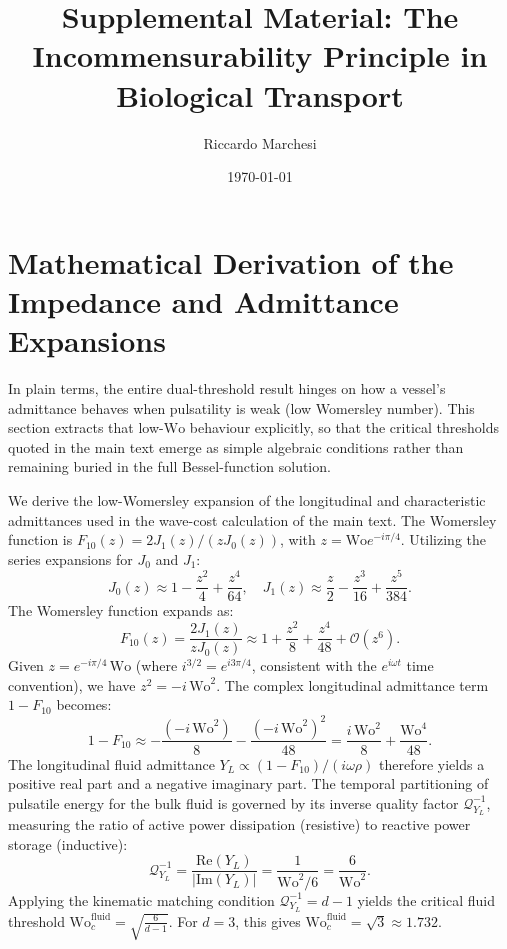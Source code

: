 \documentclass[11pt,a4paper]{article}
\title{Supplemental Material: The Incommensurability Principle in Biological Transport}
\author{Riccardo Marchesi}
\date{\today}
\theoremstyle{remark}
\begin{document}
\maketitle

\section{Mathematical Derivation of the Impedance and Admittance Expansions}
\label{sec:S1}

In plain terms, the entire dual-threshold result hinges on how a vessel's
admittance behaves when pulsatility is weak (low Womersley number). This section
extracts that low-$\mathrm{Wo}$ behaviour explicitly, so that the critical
thresholds quoted in the main text emerge as simple algebraic conditions rather
than remaining buried in the full Bessel-function solution.

We derive the low-Womersley expansion of the longitudinal and characteristic
admittances used in the wave-cost calculation of the main text. The Womersley
function is $F_{10}(z) = 2J_1(z)/(zJ_0(z))$, with $z = \mathrm{Wo} e^{-i\pi/4}$.
Utilizing the series expansions for $J_0$ and $J_1$:
\begin{equation}
    J_0(z) \approx 1 - \frac{z^2}{4} + \frac{z^4}{64}, \quad J_1(z) \approx \frac{z}{2} - \frac{z^3}{16} + \frac{z^5}{384}.
\end{equation}
The Womersley function expands as:
\begin{equation}
    F_{10}(z) = \frac{2J_1(z)}{z J_0(z)} \approx 1 + \frac{z^2}{8} + \frac{z^4}{48} + \mathcal{O}(z^6).
\end{equation}
Given $z = e^{-i\pi/4}\,\mathrm{Wo}$ (where $i^{3/2} = e^{i3\pi/4}$, consistent
with the $e^{i\omega t}$ time convention), we have $z^2 = -i\,\mathrm{Wo}^2$.
The complex longitudinal admittance term $1 - F_{10}$ becomes:
\begin{equation}
    1 - F_{10} \approx -\frac{(-i\,\mathrm{Wo}^2)}{8} - \frac{(-i\,\mathrm{Wo}^2)^2}{48}
    = \frac{i\,\mathrm{Wo}^2}{8} + \frac{\mathrm{Wo}^4}{48}.
\end{equation}
The longitudinal fluid admittance $Y_L \propto (1 - F_{10})/(i\omega\rho)$
therefore yields a positive real part and a negative imaginary part. The
temporal partitioning of pulsatile energy for the bulk fluid is governed by its
inverse quality factor $\mathcal{Q}^{-1}_{Y_L}$, measuring the ratio of active
power dissipation (resistive) to reactive power storage (inductive):
\begin{equation}
    \mathcal{Q}^{-1}_{Y_L} = \frac{\text{Re}(Y_L)}{|\text{Im}(Y_L)|} = \frac{1}{\mathrm{Wo}^2/6} = \frac{6}{\mathrm{Wo}^2}.
\end{equation}
Applying the kinematic matching condition $\mathcal{Q}^{-1}_{Y_L} = d - 1$
yields the critical fluid threshold $\mathrm{Wo}_c^{\mathrm{fluid}} =
\sqrt{\frac{6}{d-1}}$. For $d=3$, this gives $\mathrm{Wo}_c^{\mathrm{fluid}} =
\sqrt{3} \approx 1.732$.
\end{document}
